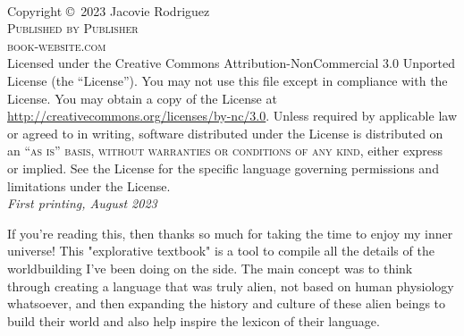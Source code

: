 \newpage
~\vfill
\thispagestyle{empty}

\noindent Copyright \copyright\ 2023 Jacovie Rodriguez\\ %

\noindent \textsc{Published by Publisher}\\ %

\noindent \textsc{book-website.com}\\ %

\noindent Licensed under the Creative Commons Attribution-NonCommercial 3.0 Unported License (the ``License''). You may not use this file except in compliance with the License. You may obtain a copy of the License at \url{http://creativecommons.org/licenses/by-nc/3.0}. Unless required by applicable law or agreed to in writing, software distributed under the License is distributed on an \textsc{``as is'' basis, without warranties or conditions of any kind}, either express or implied. See the License for the specific language governing permissions and limitations under the License.\\ %

\noindent \textit{First printing, August 2023} %




\pagestyle{empty} %

\tableofcontents %

\clearpage %

If you're reading this, then thanks so much for taking the time to enjoy my
inner universe! This "explorative textbook" is a tool to compile all the
details of the worldbuilding I've been doing on the side. The main concept was
to think through creating a language that was truly alien, not based on human
physiology whatsoever, and then expanding the history and culture of these
alien beings to build their world and also help inspire the lexicon of their
language.

